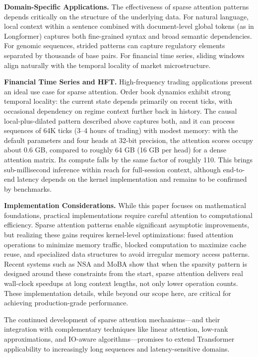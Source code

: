 \documentclass{article}
\begin{document}
\textbf{Domain-Specific Applications.} The effectiveness of sparse attention patterns depends critically on the structure of the underlying data. For natural language, local context within a sentence combined with document-level global tokens (as in Longformer) captures both fine-grained syntax and broad semantic dependencies. For genomic sequences, strided patterns can capture regulatory elements separated by thousands of base pairs. For financial time series, sliding windows align naturally with the temporal locality of market microstructure.

\textbf{Financial Time Series and HFT.} High-frequency trading applications present an ideal use case for sparse attention. Order book dynamics exhibit strong temporal locality: the current state depends primarily on recent ticks, with occasional dependency on regime context further back in history. The causal local-plus-dilated pattern described above captures both, and it can process sequences of 64K ticks (3--4 hours of trading) with modest memory: with the default parameters and four heads at 32-bit precision, the attention scores occupy about 0.6 GB, compared to roughly 64 GB (16 GB per head) for a dense attention matrix. Its compute falls by the same factor of roughly 110. This brings sub-millisecond inference within reach for full-session context, although end-to-end latency depends on the kernel implementation and remains to be confirmed by benchmarks.

\textbf{Implementation Considerations.} While this paper focuses on mathematical foundations, practical implementations require careful attention to computational efficiency. Sparse attention patterns enable significant asymptotic improvements, but realizing these gains requires kernel-level optimizations: fused attention operations to minimize memory traffic, blocked computation to maximize cache reuse, and specialized data structures to avoid irregular memory access patterns. Recent systems such as NSA and MoBA show that when the sparsity pattern is designed around these constraints from the start, sparse attention delivers real wall-clock speedups at long context lengths, not only lower operation counts. These implementation details, while beyond our scope here, are critical for achieving production-grade performance.

The continued development of sparse attention mechanisms---and their integration with complementary techniques like linear attention, low-rank approximations, and IO-aware algorithms---promises to extend Transformer applicability to increasingly long sequences and latency-sensitive domains.
\end{document}
